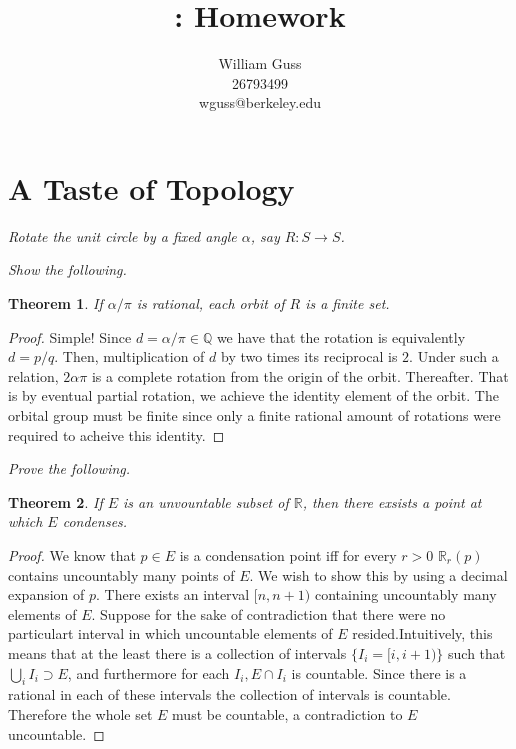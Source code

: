 \documentclass[letter]{article}
\title{\bCLASS: Homework \bHWN}
\author{William Guss\\26793499\\wguss@berkeley.edu}
\newtheorem{theorem}{Theorem}
\newenvironment{menumerate}{%
  \edef\backupindent{\the\parindent}%
  \enumerate%
  \setlength{\parindent}{\backupindent}%
}{\endenumerate}
\begin{document}
\maketitle
\thispagestyle{empty}


\setcounter{section}{1}
\section{A Taste of Topology}
\begin{menumerate}
	\setcounter{enumi}{114} %
	\item \emph{Rotate the unit circle by a fixed angle $\alpha$, say $R: S \to S$.}
		\begin{menumerate}
			\item \emph{Show the following.}
			\begin{theorem}
				If $\alpha/\pi$ is rational, each orbit of $R$ is a finite set.
			\end{theorem}
			\begin{proof}
				Simple! Since $d = \alpha/\pi \in \mathbb{Q}$ we have that the rotation is equivalently $d = p/q.$ Then, multiplication of $d$ by two times its reciprocal is $2.$ Under such a relation, $2\alpha\pi$ is a complete rotation from the origin of the orbit. Thereafter. That is by eventual partial rotation, we achieve the identity element of the orbit. The orbital group must be finite since only a finite rational amount of rotations were required to acheive this identity.
			\end{proof}
		\end{menumerate}

	\setcounter{enumi}{125}
	\item \emph{Prove the following.} 
	\begin{theorem}
		If $E$ is an unvountable subset of $\mathbb{R}$, then there exsists a point at which $E$ condenses.
	\end{theorem}
	\begin{proof}
		We know that $p\in E$ is a condensation point iff for every $r > 0$ $\mathbb{R}_r (p)$ contains uncountably many points of $E.$ We wish to show this by using a decimal expansion of $p.$ There exists an interval $[n,n+1)$ containing uncountably many elements of $E$.  Suppose for the sake of contradiction that there were no particulart interval in which uncountable elements of $E$ resided.Intuitively, this means that at the least there is a collection of intervals $\{I_i = [i, i+1)\}$ such that $\bigcup_i I_i \supset E$, and furthermore for each $I_i, E \cap I_i$ is countable. Since there is a rational in each of these intervals the collection of intervals is countable. Therefore the whole set $E$ must be countable, a contradiction to $E$ uncountable. 


\end{proof}
\end{menumerate}
\end{document}

